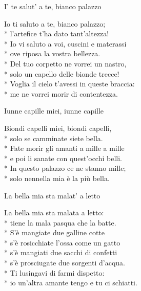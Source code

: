 \documentclass[11pt]{book}
\begin{document}
\begin{poem}{I’ te salut’ a te, bianco palazzo}{}
\settowidth{\versewidth}{Voglia il cielo t’avessi in queste braccia}
\begin{altverse}
Io ti saluto a te, bianco palazzo;\\*
l’artefice t’ha dato tant’altezza!\\*
Io vi saluto a voi, cuscini e materassi\\*
ove riposa la vostra bellezza.\\*
Del tuo corpetto ne vorrei un nastro,\\*
solo un capello delle bionde trecce!\\*
Voglia il cielo t’avessi in queste braccia:\\*
me ne vorrei morir di contentezza.
\end{altverse}
\end{poem}

\begin{poem}{Iunne capille miei, iunne capille}{}
\settowidth{\versewidth}{Fate morir gli amanti a mille a mille}
\begin{altverse}
Biondi capelli miei, biondi capelli,\\*
solo se camminate siete bella.\\*
Fate morir gli amanti a mille a mille\\*
e poi li sanate con quest’occhi belli.\\*
In questo palazzo ce ne stanno mille;\\*
solo nennella mia è la più bella.
\end{altverse}
\end{poem}

\begin{poem}{La bella mia sta malat’ a letto}{}
\settowidth{\versewidth}{Io un’altra amante tengo e tu ci schiatti}
\begin{altverse}
La bella mia sta malata a letto:\\*
tiene la mala pasqua che la batte.\\*
S’è mangiate due galline cotte\\*
s’è rosicchiate l’ossa come un gatto\\*
s’è mangiati due sacchi di confetti\\*
s’è prosciugate due sorgenti d’acqua.\\*
Ti lusingavi di farmi dispetto:\\*
io un’altra amante tengo e tu ci schiatti.
\end{altverse}
\end{poem}
\end{document}
